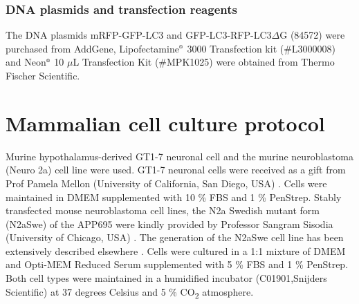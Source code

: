 \subsubsection{DNA plasmids and transfection reagents}
The DNA plasmids mRFP-GFP-LC3 and GFP-LC3-RFP-LC3$\Delta$G (84572) were purchased from AddGene, Lipofectamine${\textsuperscript{\tiny{\textregistered}}}$ 3000 Transfection kit (\#L3000008) and Neon${\textsuperscript{\tiny{\textregistered}}}$ 10 $\mu$L Transfection Kit (\#MPK1025) were obtained from Thermo Fischer Scientific.

\section{Mammalian cell culture protocol}
Murine hypothalamus-derived GT1-7 neuronal cell and the murine neuroblastoma (Neuro 2a) cell line were used. GT1-7 neuronal cells were received as a gift from Prof Pamela Mellon (University of California, San Diego, USA) \citep{Mellon1990}. Cells were maintained in DMEM supplemented with 10 \% FBS and 1 \% PenStrep. Stably transfected mouse neuroblastoma cell lines, the N2a Swedish mutant form (N2aSwe) of the APP695 were kindly provided by Professor Sangram Sisodia (University of Chicago, USA) \citep{Sisodia1990}. The generation of the N2aSwe cell line has been extensively described elsewhere \citep{Lo1994}. Cells were cultured in a 1:1 mixture of DMEM and Opti-MEM Reduced Serum supplemented with 5 \% FBS and 1 \% PenStrep. Both cell types were maintained in a humidified incubator (C01901,Snijders Scientific) at 37 degrees Celsius and 5 \% CO\textsubscript{2} atmosphere.


